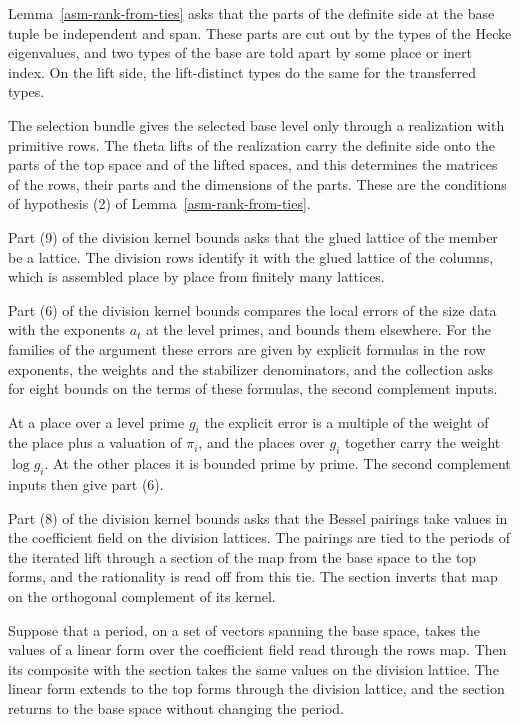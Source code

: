 Lemma~\ref{asm-rank-from-ties} asks that the parts of the definite side at the
base tuple be independent and span. These parts are cut out by the types of the
Hecke eigenvalues, and two types of the base are told apart by some place or
inert index. On the lift side, the lift-distinct types do the same for the
transferred types.

The selection bundle gives the selected base level only through a realization
with primitive rows. The theta lifts of the realization carry the definite side
onto the parts of the top space and of the lifted spaces, and this determines
the matrices of the rows, their parts and the dimensions of the parts. These
are the conditions of hypothesis (2) of Lemma~\ref{asm-rank-from-ties}.

Part (9) of the division kernel bounds asks that the glued lattice of the
member be a lattice. The division rows identify it with the glued lattice of
the columns, which is assembled place by place from finitely many lattices.

Part (6) of the division kernel bounds compares the local errors of the size
data with the exponents $a_t$ at the level primes, and bounds them elsewhere.
For the families of the argument these errors are given by explicit formulas
in the row exponents, the weights and the stabilizer denominators, and the
collection asks for eight bounds on the terms of these formulas, the second
complement inputs.

At a place over a level prime $g_i$ the explicit error is a multiple of the
weight of the place plus a valuation of $\pi_i$, and the places over $g_i$
together carry the weight $\log g_i$. At the other places it is bounded prime
by prime. The second complement inputs then give part (6).

Part (8) of the division kernel bounds asks that the Bessel pairings take
values in the coefficient field on the division lattices. The pairings are
tied to the periods of the iterated lift through a section of the map from the
base space to the top forms, and the rationality is read off from this tie.
The section inverts that map on the orthogonal complement of its kernel.

Suppose that a period, on a set of vectors spanning the base space, takes the
values of a linear form over the coefficient field read through the rows map.
Then its composite with the section takes the same values on the division
lattice. The linear form extends to the top forms through the division
lattice, and the section returns to the base space without changing the
period.

